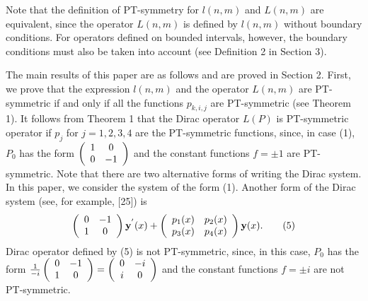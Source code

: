 \documentclass{article}%
\begin{document}
Note that the definition of PT-symmetry for $l(n,m)$ and $L(n,m)$ are
equivalent, since the operator $L(n,m)$ is defined by $l(n,m)$ without
boundary conditions. For operators defined on bounded intervals, however, the
boundary conditions must also be taken into account (see Definition 2 in
Section 3).

The main results of this paper are as follows and are proved in Section 2.
First, we prove that the expression $l(n,m)$ and the operator $L(n,m)$ are
PT-symmetric if and only if all the functions $p_{k,i,j}$ are PT-symmetric
(see Theorem 1). It follows from Theorem 1 that the Dirac operator $L(P)$ is
PT-symmetric operator if $p_{j}$ for $j=1,2,3,4$ are the PT-symmetric
functions, since, in case (1), $P_{0}$ has the form $\left(
\begin{array}
[c]{cc}%
1 & 0\\
0 & -1
\end{array}
\right)  $ and the constant functions $f=\pm1$ are PT-symmetric. Note that
there are two alternative forms of writing the Dirac system. In this paper, we
consider the system of the form (1). Another form of the Dirac system (see,
for example, [25]) is%
\begin{equation}
\left(
\begin{array}
[c]{cc}%
0 & -1\\
1 & 0
\end{array}
\right)  \mathbf{y}^{^{\prime}}(x)+\left(
\begin{array}
[c]{cc}%
p_{1}(x) & p_{2}(x)\\
p_{3}(x) & p_{4}(x)
\end{array}
\right)  \mathbf{y}(x). \tag{5}%
\end{equation}
Dirac operator defined by (5) is not PT-symmetric, since, in this case,
$P_{0}$ has the form $\frac{1}{-i}\left(
\begin{array}
[c]{cc}%
0 & -1\\
1 & 0
\end{array}
\right)  =\left(
\begin{array}
[c]{cc}%
0 & -i\\
i & 0
\end{array}
\right)  $ and the constant functions $f=\pm i$ are not PT-symmetric. \ 
\end{document}
